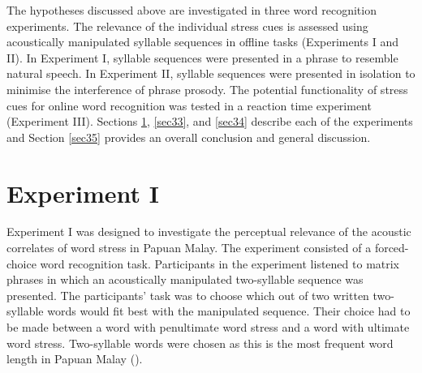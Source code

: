 The hypotheses discussed above are investigated in three word recognition experiments. The relevance of the individual stress cues is assessed using acoustically manipulated syllable sequences in offline tasks (Experiments I and II). In Experiment I, syllable sequences were presented in a phrase to resemble natural speech. In Experiment II, syllable sequences were presented in isolation to minimise the interference of phrase prosody. The potential functionality of stress cues for online word recognition was tested in a reaction time experiment (Experiment III). Sections \ref{sec32}, \ref{sec33}, and \ref{sec34} describe each of the experiments and Section \ref{sec35} provides an overall conclusion and general discussion.

\section{Experiment I} \label{sec32}
Experiment I was designed to investigate the perceptual relevance of the acoustic correlates of word stress in Papuan Malay. The experiment consisted of a forced-choice word recognition task. Participants in the experiment listened to matrix phrases in which an acoustically manipulated two-syllable sequence was presented. The participants' task was to choose which out of two written two-syllable words would fit best with the manipulated sequence. Their choice had to be made between a word with penultimate word stress and a word with ultimate word stress. Two-syllable words were chosen as this is the most frequent word length in Papuan Malay (\citealt{kluge_grammar_2017}).

